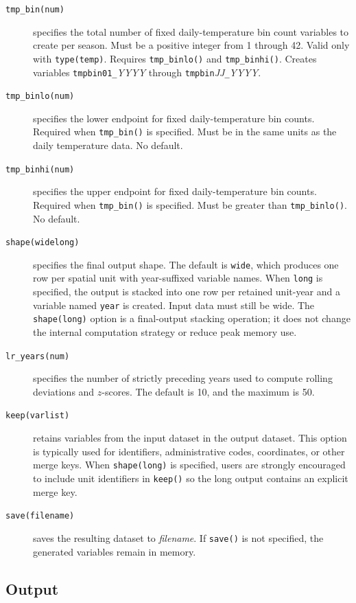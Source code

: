 \begin{description}
	\item[\texttt{tmp\_bin(num)}] specifies the total number of fixed daily-temperature bin count variables to create per season. Must be a positive integer from 1 through 42. Valid only with \texttt{type(temp)}. Requires \texttt{tmp\_binlo()} and \texttt{tmp\_binhi()}. Creates variables \texttt{tmpbin01\_}\textit{YYYY} through \texttt{tmpbin}\textit{JJ}\texttt{\_}\textit{YYYY}.
	\item[\texttt{tmp\_binlo(num)}] specifies the lower endpoint for fixed daily-temperature bin counts. Required when \texttt{tmp\_bin()} is specified. Must be in the same units as the daily temperature data. No default.
	\item[\texttt{tmp\_binhi(num)}] specifies the upper endpoint for fixed daily-temperature bin counts. Required when \texttt{tmp\_bin()} is specified. Must be greater than \texttt{tmp\_binlo()}. No default.
	\item[\texttt{shape(wide\textbar long)}] specifies the final output shape. The default is \texttt{wide}, which produces one row per spatial unit with year-suffixed variable names. When \texttt{long} is specified, the output is stacked into one row per retained unit-year and a variable named \texttt{year} is created. Input data must still be wide. The \texttt{shape(long)} option is a final-output stacking operation; it does not change the internal computation strategy or reduce peak memory use.
	\item[\texttt{lr\_years(num)}] specifies the number of strictly preceding years used to compute rolling deviations and $z$-scores. The default is 10, and the maximum is 50.
	\item[\texttt{keep(varlist)}] retains variables from the input dataset in the output dataset. This option is typically used for identifiers, administrative codes, coordinates, or other merge keys. When \texttt{shape(long)} is specified, users are strongly encouraged to include unit identifiers in \texttt{keep()} so the long output contains an explicit merge key.
	\item[\texttt{save(filename)}] saves the resulting dataset to \textit{filename}. If \texttt{save()} is not specified, the generated variables remain in memory.
\end{description}

\subsection{Output}

